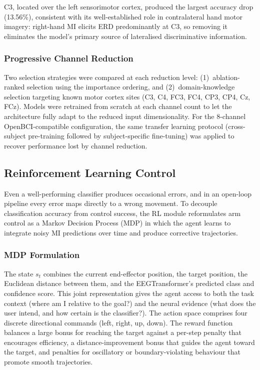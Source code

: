 \documentclass[12pt, a4paper]{article}
\begin{document}
C3, located over the left sensorimotor cortex, produced the largest accuracy drop (13.56\%), consistent with its well-established role in contralateral hand motor imagery: right-hand MI elicits ERD predominantly at C3, so removing it eliminates the model's primary source of lateralised discriminative information.

\subsubsection{Progressive Channel Reduction}

Two selection strategies were compared at each reduction level: (1)~ablation-ranked selection using the importance ordering, and (2)~domain-knowledge selection targeting known motor cortex sites (C3, C4, FC3, FC4, CP3, CP4, Cz, FCz). Models were retrained from scratch at each channel count to let the architecture fully adapt to the reduced input dimensionality. For the 8-channel OpenBCI-compatible configuration, the same transfer learning protocol (cross-subject pre-training followed by subject-specific fine-tuning) was applied to recover performance lost by channel reduction.

\subsection{Reinforcement Learning Control}

Even a well-performing classifier produces occasional errors, and in an open-loop pipeline every error maps directly to a wrong movement. To decouple classification accuracy from control success, the RL module reformulates arm control as a Markov Decision Process (MDP) in which the agent learns to integrate noisy MI predictions over time and produce corrective trajectories.

\subsubsection{MDP Formulation}

The state $s_t$ combines the current end-effector position, the target position, the Euclidean distance between them, and the EEGTransformer's predicted class and confidence score. This joint representation gives the agent access to both the task context (where am I relative to the goal?) and the neural evidence (what does the user intend, and how certain is the classifier?). The action space comprises four discrete directional commands (left, right, up, down). The reward function balances a large bonus for reaching the target against a per-step penalty that encourages efficiency, a distance-improvement bonus that guides the agent toward the target, and penalties for oscillatory or boundary-violating behaviour that promote smooth trajectories.
\end{document}

